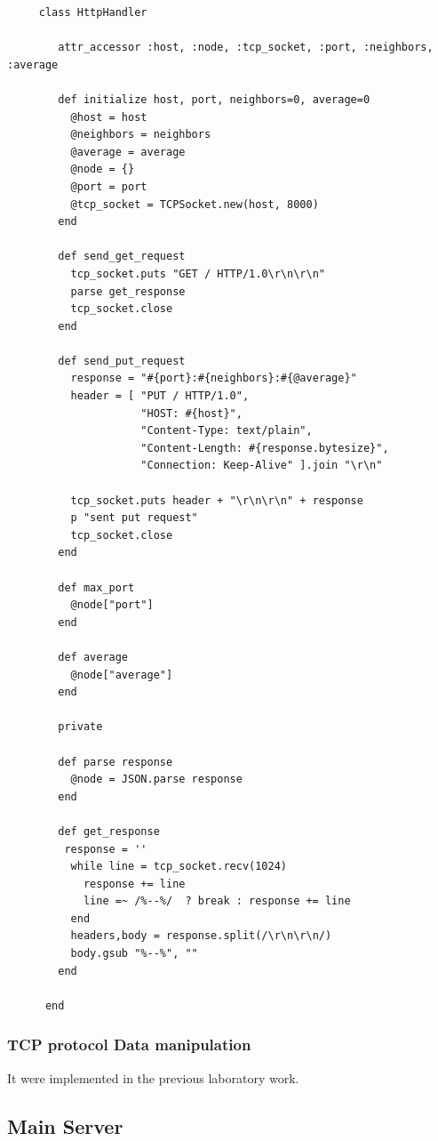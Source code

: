 \documentclass[12pt]{article}
\begin{document}
    \begin{lstlisting}
     class HttpHandler

        attr_accessor :host, :node, :tcp_socket, :port, :neighbors, :average

        def initialize host, port, neighbors=0, average=0
          @host = host
          @neighbors = neighbors
          @average = average
          @node = {}
          @port = port
          @tcp_socket = TCPSocket.new(host, 8000)
        end

        def send_get_request
          tcp_socket.puts "GET / HTTP/1.0\r\n\r\n"
          parse get_response
          tcp_socket.close
        end

        def send_put_request
          response = "#{port}:#{neighbors}:#{@average}"
          header = [ "PUT / HTTP/1.0",
                     "HOST: #{host}",
                     "Content-Type: text/plain",
                     "Content-Length: #{response.bytesize}",
                     "Connection: Keep-Alive" ].join "\r\n"

          tcp_socket.puts header + "\r\n\r\n" + response
          p "sent put request"
          tcp_socket.close
        end

        def max_port
          @node["port"]
        end

        def average
          @node["average"]
        end

        private

        def parse response
          @node = JSON.parse response
        end 

        def get_response
         response = ''
          while line = tcp_socket.recv(1024)
            response += line
            line =~ /%--%/  ? break : response += line
          end
          headers,body = response.split(/\r\n\r\n/)
          body.gsub "%--%", ""
        end

      end
    \end{lstlisting}

    \subsubsection{TCP protocol Data manipulation}

    It were implemented in the previous laboratory work.
  
    \subsection{Main Server}
\end{document}
